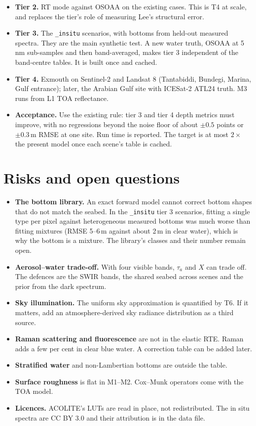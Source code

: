 \documentclass[11pt]{article}
\numberwithin{equation}{section}
\newcommand{\code}[1]{\texttt{#1}}
\begin{document}
\begin{itemize}
\item \textbf{Tier 2.} RT mode against OSOAA on the existing cases. This is T4 at scale, and
replaces the tier's role of measuring Lee's structural error.
\item \textbf{Tier 3.} The \code{\_insitu} scenarios, with bottoms from held-out measured
spectra. They are the main synthetic test. A new water truth, OSOAA at 5\,nm sub-samples and
then band-averaged, makes tier 3 independent of the band-centre tables. It is built once and
cached.
\item \textbf{Tier 4.} Exmouth on Sentinel-2 and Landsat 8 (Tantabiddi, Bundegi, Marina, Gulf
entrance); later, the Arabian Gulf site with ICESat-2 ATL24 truth. M3 runs from L1 TOA
reflectance.
\item \textbf{Acceptance.} Use the existing rule: tier 3 and tier 4 depth metrics must improve,
with no regressions beyond the noise floor of about $\pm0.5$ points or $\pm0.3$\,m RMSE at one
site. Run time is reported. The target is at most $2\times$ the present model once each
scene's table is cached.
\end{itemize}

\section{Risks and open questions}\label{sec:risks}

\begin{itemize}
\item \textbf{The bottom library.} An exact forward model cannot correct bottom shapes that do
not match the seabed. In the \code{\_insitu} tier 3 scenarios, fitting a single type per pixel
against heterogeneous measured bottoms was much worse than fitting mixtures (RMSE 5--6\,m
against about 2\,m in clear water), which is why the bottom is a mixture. The library's
classes and their number remain open.
\item \textbf{Aerosol--water trade-off.} With four visible bands, $\tau_a$ and $X$ can trade off.
The defences are the SWIR bands, the shared seabed across scenes and the prior from the dark
spectrum.
\item \textbf{Sky illumination.} The uniform sky approximation is quantified by T6. If it matters,
add an atmosphere-derived sky radiance distribution as a third source.
\item \textbf{Raman scattering and fluorescence} are not in the elastic RTE. Raman adds a few per
cent in clear blue water. A correction table can be added later.
\item \textbf{Stratified water} and non-Lambertian bottoms are outside the table.
\item \textbf{Surface roughness} is flat in M1--M2. Cox--Munk operators come with the TOA model.
\item \textbf{Licences.} ACOLITE's LUTs are read in place, not redistributed. The in situ
spectra are CC BY 3.0 and their attribution is in the data file.
\end{itemize}
\end{document}
